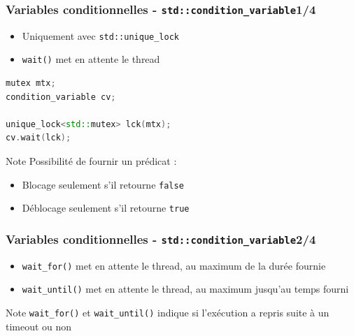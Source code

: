 \documentclass[C++.tex]{subfiles}
\begin{document}
\begin{frame}[fragile]
	\frametitle{Variables conditionnelles - \lstinline|std::condition_variable|\titlehfill{}1/4}
	\begin{itemize}
		\item Uniquement avec \lstinline|std::unique_lock|
		\item \lstinline|wait()| met en attente le thread
	\end{itemize}

	\begin{lstlisting}[language=C++]
mutex mtx;
condition_variable cv;

unique_lock<std::mutex> lck(mtx);
cv.wait(lck);\end{lstlisting}

	\begin{block}{Note}
		Possibilité de fournir un prédicat :
		\begin{itemize}
			\item Blocage seulement s'il retourne \lstinline|false|
			\item Déblocage seulement s'il retourne \lstinline|true|
		\end{itemize}
	\end{block}
\end{frame}

\begin{frame}[fragile]
	\frametitle{Variables conditionnelles - \lstinline|std::condition_variable|\titlehfill{}2/4}
	\begin{itemize}
		\item \lstinline|wait_for()| met en attente le thread, au maximum de la durée fournie
		\item \lstinline|wait_until()| met en attente le thread, au maximum jusqu'au temps fourni
	\end{itemize}

	\begin{block}{Note}
		\lstinline|wait_for()| et \lstinline|wait_until()| indique si l'exécution a repris suite à un timeout ou non
	\end{block}
\end{frame}
\end{document}
